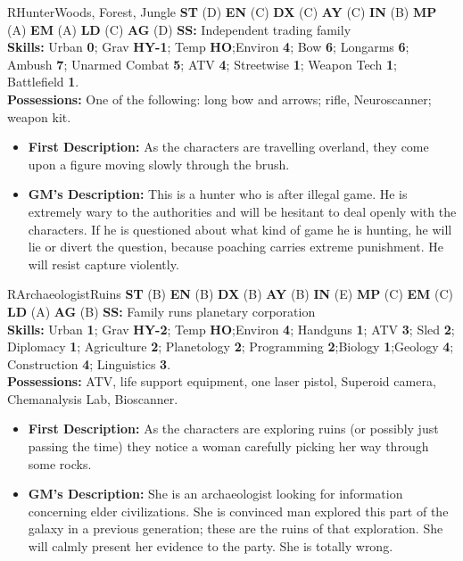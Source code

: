 \hrulefill

\begin{npc}{R}{Hunter}{Woods, Forest, Jungle}
\textbf{ST} (D) \textbf{EN} (C) \textbf{DX} (C) \textbf{AY} (C) \textbf{IN} (B) \textbf{MP} (A) \textbf{EM} (A) \textbf{LD} (C) \textbf{AG} (D) \textbf{SS:} Independent trading family \\
\textbf{Skills:} Urban \textbf{0}; Grav \textbf{HY-1}; Temp \textbf{HO};Environ \textbf{4}; Bow \textbf{6}; Longarms \textbf{6}; Ambush \textbf{7}; Unarmed Combat \textbf{5}; ATV \textbf{4}; Streetwise \textbf{1}; 
Weapon Tech \textbf{1}; Battlefield \textbf{1}. \\
\textbf{Possessions:} One of the following: long bow and arrows; rifle, Neuroscanner; weapon kit. 
\begin{itemize}
\item \textbf{First Description:} As the characters are travelling overland, they come upon a figure moving slowly through the brush. 
\item \textbf{GM's Description:} This is a hunter who is after illegal game. He is extremely wary to the authorities and will be hesitant to deal 
openly with the characters. If he is questioned about what kind of game he is hunting, he will lie or divert the question, because 
poaching carries extreme punishment. He will resist capture violently. 
\end{itemize}
\end{npc}

\hrulefill

\begin{npc}{R}{Archaeologist}{Ruins}
\textbf{ST} (B) \textbf{EN} (B) \textbf{DX} (B) \textbf{AY} (B) \textbf{IN} (E) \textbf{MP} (C) \textbf{EM} (C) \textbf{LD} (A) \textbf{AG} (B) \textbf{SS:} Family runs planetary corporation \\
\textbf{Skills:} Urban \textbf{1}; Grav \textbf{HY-2}; Temp \textbf{HO};Environ \textbf{4}; Handguns \textbf{1}; ATV \textbf{3}; Sled \textbf{2}; Diplomacy \textbf{1}; Agriculture \textbf{2}; Planetology \textbf{2}; 
Programming \textbf{2};Biology \textbf{1};Geology \textbf{4}; Construction \textbf{4}; Linguistics \textbf{3}. \\
\textbf{Possessions:} ATV, life support equipment, one laser pistol, Superoid camera, Chemanalysis Lab, Bioscanner. 
\begin{itemize}
\item \textbf{First Description:} As the characters are exploring ruins (or possibly just passing the time) they notice a woman carefully picking her 
way through some rocks. 
\item \textbf{GM's Description:} She is an archaeologist looking for information concerning elder civilizations. She is convinced man explored this 
part of the galaxy in a previous generation; these are the ruins of that exploration. She will calmly present her evidence to the party. 
She is totally wrong. 
\end{itemize}
\end{npc}

